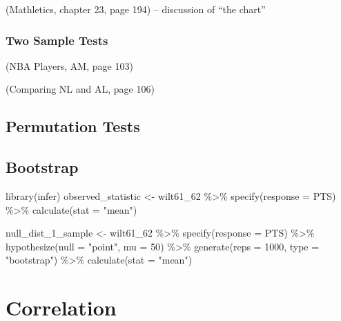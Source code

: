 \documentclass[
  11pt,
]{book}
\newenvironment{Shaded}{\begin{snugshade}}{\end{snugshade}}
\newcommand{\AttributeTok}[1]{\textcolor[rgb]{0.77,0.63,0.00}{#1}}
\newcommand{\DecValTok}[1]{\textcolor[rgb]{0.00,0.00,0.81}{#1}}
\newcommand{\FunctionTok}[1]{\textcolor[rgb]{0.00,0.00,0.00}{#1}}
\newcommand{\NormalTok}[1]{#1}
\newcommand{\OtherTok}[1]{\textcolor[rgb]{0.56,0.35,0.01}{#1}}
\newcommand{\SpecialCharTok}[1]{\textcolor[rgb]{0.00,0.00,0.00}{#1}}
\newcommand{\StringTok}[1]{\textcolor[rgb]{0.31,0.60,0.02}{#1}}
\theoremstyle{definition}
\theoremstyle{definition}
\theoremstyle{definition}
\theoremstyle{definition}
\theoremstyle{remark}
\begin{document}
(Mathletics, chapter 23, page 194) -- discussion of ``the chart''

\hypertarget{two-sample-tests}{%
\subsection{Two Sample Tests}\label{two-sample-tests}}

(NBA Players, AM, page 103)

(Comparing NL and AL, page 106)

\hypertarget{permutation-tests}{%
\section{Permutation Tests}\label{permutation-tests}}

\hypertarget{bootstrap}{%
\section{Bootstrap}\label{bootstrap}}

\begin{Shaded}
\begin{Highlighting}[]
\FunctionTok{library}\NormalTok{(infer)}
\NormalTok{observed\_statistic }\OtherTok{\textless{}{-}}\NormalTok{ wilt61\_62 }\SpecialCharTok{\%\textgreater{}\%}
  \FunctionTok{specify}\NormalTok{(}\AttributeTok{response =}\NormalTok{ PTS) }\SpecialCharTok{\%\textgreater{}\%}
  \FunctionTok{calculate}\NormalTok{(}\AttributeTok{stat =} \StringTok{"mean"}\NormalTok{)}

\NormalTok{null\_dist\_1\_sample }\OtherTok{\textless{}{-}}\NormalTok{ wilt61\_62 }\SpecialCharTok{\%\textgreater{}\%}
  \FunctionTok{specify}\NormalTok{(}\AttributeTok{response =}\NormalTok{ PTS) }\SpecialCharTok{\%\textgreater{}\%}
  \FunctionTok{hypothesize}\NormalTok{(}\AttributeTok{null =} \StringTok{"point"}\NormalTok{, }\AttributeTok{mu =} \DecValTok{50}\NormalTok{) }\SpecialCharTok{\%\textgreater{}\%}
  \FunctionTok{generate}\NormalTok{(}\AttributeTok{reps =} \DecValTok{1000}\NormalTok{, }\AttributeTok{type =} \StringTok{"bootstrap"}\NormalTok{) }\SpecialCharTok{\%\textgreater{}\%}
  \FunctionTok{calculate}\NormalTok{(}\AttributeTok{stat =} \StringTok{"mean"}\NormalTok{)}
\end{Highlighting}
\end{Shaded}

\hypertarget{correlation}{%
\chapter{Correlation}\label{correlation}}
\end{document}

